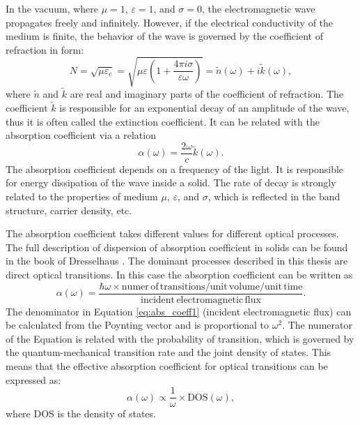 \documentclass[titlepage,a4paper]{book}
\begin{document}
In the vacuum, where $\mu = 1$, $\varepsilon = 1$, and $\sigma = 0$, the electromagnetic wave propagates freely and infinitely. However, if the electrical conductivity of the medium is finite, the behavior of the wave is governed by the coefficient of refraction in form:
\begin{equation}
\label{eq:Solution_K6}
N = \sqrt{\mu\varepsilon_c} = \sqrt{\mu\varepsilon \left(1 + \frac{4\pi i \sigma}{\varepsilon \omega} \right)} = \tilde{n}(\omega) + i\tilde{k}(\omega),
\end{equation}
where $\tilde{n}$ and $\tilde{k}$ are real and imaginary parts of the coefficient of refraction. The coefficient $\tilde{k}$ is responsible for an exponential decay of an amplitude of the wave, thus it is often called the extinction coefficient. It can be related with the absorption coefficient via a relation
\begin{equation}
\label{eq:Solution_K7}
\alpha (\omega) = \frac{2\omega}{c} \tilde{k}(\omega).
\end{equation}
The absorption coefficient depends on a frequency of the light. It is responsible for energy dissipation of the wave inside a solid. The rate of decay is strongly related to the properties of medium $\mu$, $\varepsilon$, and $\sigma$, which is reflected in the band structure, carrier density, etc.

The absorption coefficient takes different values for different optical processes. The full description of dispersion of absorption coefficient in solids can be found in the book of Dresselhaus \cite{Dresselhaus}. The dominant processes described in this thesis are direct optical transitions. In this case the absorption coefficient can be written as
\begin{equation}
\label{eq:abs_coeff1}
\alpha (\omega) = \frac{\hbar\omega \times \mathrm{numer\, of\, transitions/unit\, volume/unit\, time}}{\mathrm{incident\, electromagnetic\, flux}}.
\end{equation}
The denominator in Equation \ref{eq:abs_coeff1} (incident electromagnetic flux) can be calculated from the Poynting vector and is proportional to $\omega^2$. The numerator of the Equation is related with the probability of transition, which is governed by the quantum-mechanical transition rate and the joint density of states. This means that the effective absorption coefficient for optical transitions can be expressed as:
\begin{equation}
\label{eq:abs_coeff1}
\alpha (\omega) \propto \frac{1}{\omega} \times \mathrm{DOS}(\omega),
\end{equation}
where DOS is the density of states.
\end{document}
